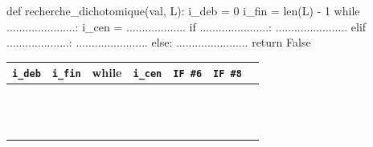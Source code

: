 \begin{exercice_cours}{}

	\begin{minipage}{0.49\linewidth}
		

	\begin{CodePythontexAlt}[TaillePolice=\normalsize, Largeur=1\linewidth,Centre,PremLigne=1, Lignes=true,]{}
			def recherche_dichotomique(val, L):
				i_deb = 0
				i_fin = len(L) - 1
				while ......................:
					i_cen = ...................
					if ......................:
						.......................
					elif ....................:
						.......................
					else:
						.......................
				return False
			
			\end{CodePythontexAlt}
			
	\end{minipage}\hfill{}
	\begin{minipage}{0.49\linewidth}
		
		\begin{tabular}{|c|c|c|c|c|c|c|}
			\hline
			 \verb+i_deb+ & \verb+i_fin+ & while & \verb+i_cen+ & \verb+IF #6+ & \verb+IF #8+ \\ \hline
			&&&&& \\ \hline
			&&&&& \\ \hline
			&&&&& \\ \hline
			&&&&& \\ \hline
			&&&&& \\ \hline
			&&&&& \\ \hline
			&&&&& \\ \hline
			&&&&& \\ \hline
			&&&&& \\ \hline
			&&&&& \\ \hline
			&&&&& \\ \hline
			&&&&& \\ \hline
			&&&&& \\ \hline
		\end{tabular}
	\end{minipage}



\end{exercice_cours}
